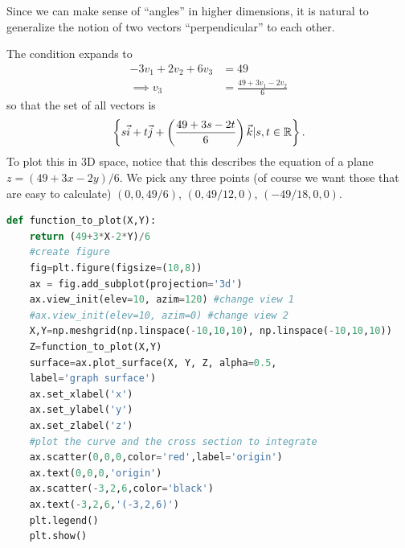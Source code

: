 Since we can make sense of ``angles'' in higher dimensions, it is natural to generalize the notion of two vectors ``perpendicular'' to each other.

\label{plane_projection}
The condition expands to \begin{align*}
	-3v_1+2v_2+6v_3 &= 49 \\
	\implies v_3 &= \frac{49+3v_1 - 2v_2}{6}  
\end{align*}
so that the set of all vectors is \[
	\left\{s \vec{i}+t \vec{j}+\left(\frac{49+3s - 2t}{6}\right) \vec{k} | s,t\in\mathbb{R}\right\}.
\]
To plot this in 3D space, notice that this describes the equation of a plane $z={(49+3x-2y)}/{6}$. We pick any three points (of course we want those that are easy to calculate) $(0,0,49/6)$, $(0,49/12,0)$, $(-49/18,0,0)$.

\begin{lstlisting}[language=Python]
	def function_to_plot(X,Y):
	return (49+3*X-2*Y)/6
	#create figure
	fig=plt.figure(figsize=(10,8))
	ax = fig.add_subplot(projection='3d')
	ax.view_init(elev=10, azim=120) #change view 1  
	#ax.view_init(elev=10, azim=0) #change view 2
	X,Y=np.meshgrid(np.linspace(-10,10,10), np.linspace(-10,10,10))
	Z=function_to_plot(X,Y)
	surface=ax.plot_surface(X, Y, Z, alpha=0.5,
	label='graph surface')
	ax.set_xlabel('x')
	ax.set_ylabel('y')
	ax.set_zlabel('z')
	#plot the curve and the cross section to integrate
	ax.scatter(0,0,0,color='red',label='origin')
	ax.text(0,0,0,'origin')
	ax.scatter(-3,2,6,color='black')
	ax.text(-3,2,6,'(-3,2,6)')
	plt.legend()
	plt.show()
\end{lstlisting}

